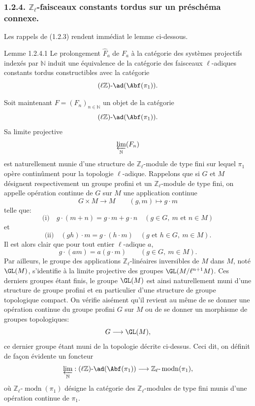 \subsubsection*{1.2.4. \(\mathbb{Z}_\ell\)-faisceaux constants tordus sur un préschéma connexe.}

Les rappels de (1.2.3) rendent immédiat le lemme ci-dessous.

\begin{statement}{Lemme 1.2.4.1}
Le prolongement \(\widehat F_a\) de \(F_a\) à la catégorie des systèmes projectifs indexés par \(\mathbb{N}\) induit une équivalence de la catégorie des faisceaux \(\ell\)-adiques constants tordus constructibles avec la catégorie
\[
(\ell\mathbb{Z})\text{-}\ad(\Abf(\pi_1)).
\]
\end{statement}

Soit maintenant \(F=(F_n)_{n\in\mathbb{N}}\) un objet de la catégorie
\[
(\ell\mathbb{Z})\text{-}\ad(\Abf(\pi_1)).
\]
Sa limite projective
\[
\varprojlim_{\mathbb{N}}(F_n)
\]
est naturellement munie d'une structure de \(\mathbb{Z}_\ell\)-module de type fini sur lequel \(\pi_1\) opère continûment pour la topologie \(\ell\)-adique. Rappelons que si \(G\) et \(M\) désignent respectivement un groupe profini et un \(\mathbb{Z}_\ell\)-module de type fini, on appelle opération continue de \(G\) sur \(M\) une application continue
\[
G\times M\longrightarrow M\qquad (g,m)\longmapsto g\cdot m
\]
telle que:
\[
\text{(i)}\quad g\cdot(m+n)=g\cdot m+g\cdot n\quad (g\in G,\ m\text{ et }n\in M)
\]
et
\[
\text{(ii)}\quad (gh)\cdot m=g\cdot(h\cdot m)\quad (g\text{ et }h\in G,\ m\in M).
\]
Il est alors clair que pour tout entier \(\ell\)-adique \(a\),
\[
g\cdot(am)=a(g\cdot m)\qquad (g\in G,\ m\in M).
\]
Par ailleurs, le groupe des applications \(\mathbb{Z}_\ell\)-linéaires inversibles de \(M\) dans \(M\), noté \(\GL(M)\), s'identifie à la limite projective des groupes 
\(\GL(M/\ell^{n+1}M)\). Ces
derniers groupes étant finis, le groupe \(\GL(M)\) est ainsi naturellement muni d'une structure de groupe profini et en particulier d'une structure de groupe topologique compact. On vérifie aisément qu'il revient au même de se donner une opération continue du groupe profini \(G\) sur \(M\) ou de se donner un morphisme de groupes topologiques:
\[
G\longrightarrow \GL(M),
\]
ce dernier groupe étant muni de la topologie décrite ci-dessus. Ceci dit, on définit de façon évidente un foncteur
\[
\varprojlim_{\mathbb{N}}:(\ell\mathbb{Z})\text{-}\ad(\Abf(\pi_1))\longrightarrow
\mathbb{Z}_\ell\text{-}\operatorname{modn}(\pi_1),
\]
où \(\mathbb{Z}_\ell\text{-}\operatorname{modn}(\pi_1)\) désigne la catégorie des \(\mathbb{Z}_\ell\)-modules de type fini munis d'une opération continue de \(\pi_1\).

